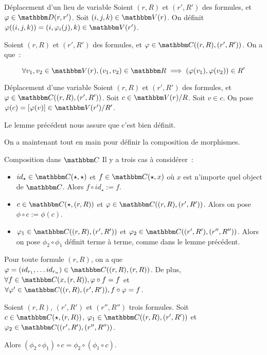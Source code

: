 \begin{defi}{Déplacement d'un lieu de variable}
    Soient $(r,R)$ et $(r',R')$ des formules, et $\phi\in\D(r,r')$.
    Soit $(i,j,k)\in\V(r)$. On définit $\phi((i,j,k)) = (i, \phi_i(j), k)\in\V(r')$.
\end{defi}

\begin{lem}
    Soient $(r,R)$ et $(r',R')$ des formules, et $\phi\in\C((r,R),(r',R'))$.
    On a que~:
    
    \[\forall v_1,v_2\in\V(r), (v_1,v_2)\in\R\implies (\phi(v_1),\phi(v_2))\in R'\]
\end{lem}

\begin{defi}{Déplacement d'une variable}
    Soient $(r,R)$ et $(r',R')$ des formules, et $\phi\in\C((r,R),(r',R'))$.
    Soit $c\in\V(r)/R$. Soit $v\in c$. On pose $\phi(c) = [\phi(v)]\in\V(r')/R'$.

    Le lemme précédent nous assure que c'est bien définit.
\end{defi}

On a maintenant tout en main pour définir la composition de morphismes.

\begin{defi}{Composition dans $\C$}
    Il y a trois cas à considérer~:\begin{itemize}
        \item $id_\star\in\C(\star,\star)$ et $f\in\C(\star, x)$ où $x$ est n'importe
            quel object de $\C$. Alors $f\circ id_\star := f$.
        \item $c\in\C(\star, (r,R))$ et $\phi\in\C((r,R), (r',R'))$. Alors
            on pose $\phi\circ c := \phi(c)$.
        \item $\phi_1\in\C((r,R),(r',R'))$ et $\phi_2\in\C((r',R'),(r'',R''))$. Alors
            on pose $\phi_2\circ\phi_1$ définit terme à terme, comme dans le lemme
            précédent.
    \end{itemize}
\end{defi}

\begin{lem}
    Pour toute formule $(r,R)$, on a que
        $\phi=(id_{r_1},\dots id_{r_n})\in\C((r,R),(r,R))$.
    De plus, $\forall f\in\C(x, (r,R)), \phi\circ f = f$
    et $\forall \phi'\in\C((r,R), (r',R')), f\circ\phi = f$.
\end{lem}

\begin{lem}
    Soient $(r,R)$, $(r',R')$ et $(r'',R'')$ trois formules. Soit $c\in\C(\star,(r,R))$,
    $\phi_1\in\C((r,R), (r',R'))$ et $\phi_2\in\C((r',R'), (r'',R''))$.

    Alors $(\phi_2\circ\phi_1)\circ c = \phi_2\circ (\phi_1\circ c)$.
\end{lem}

